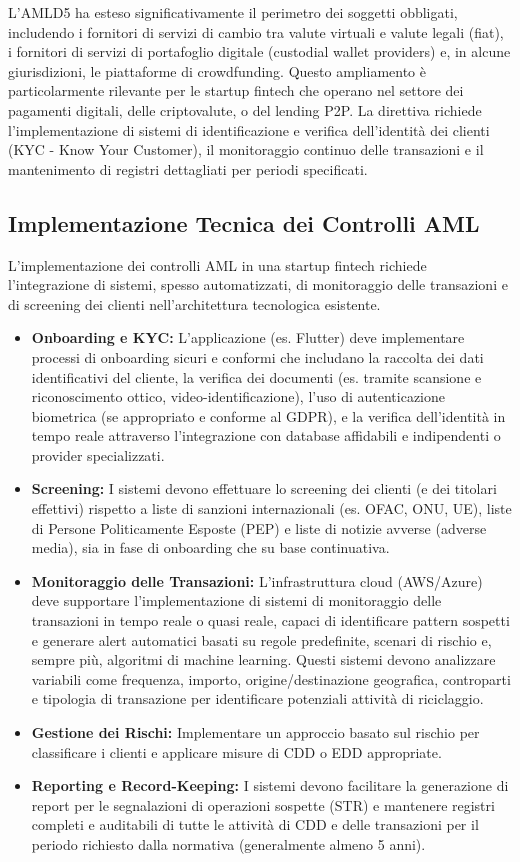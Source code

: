 L'AMLD5 ha esteso significativamente il perimetro dei soggetti obbligati, includendo i fornitori di servizi di cambio tra valute virtuali e valute legali (fiat), i fornitori di servizi di portafoglio digitale (custodial wallet providers) e, in alcune giurisdizioni, le piattaforme di crowdfunding. Questo ampliamento è particolarmente rilevante per le startup fintech che operano nel settore dei pagamenti digitali, delle criptovalute, o del lending P2P. La direttiva richiede l'implementazione di sistemi di identificazione e verifica dell'identità dei clienti (KYC - Know Your Customer), il monitoraggio continuo delle transazioni e il mantenimento di registri dettagliati per periodi specificati.

\subsection{Implementazione Tecnica dei Controlli AML}
L'implementazione dei controlli AML in una startup fintech richiede l'integrazione di sistemi, spesso automatizzati, di monitoraggio delle transazioni e di screening dei clienti nell'architettura tecnologica esistente.
\begin{itemize}
    \item \textbf{Onboarding e KYC:} L'applicazione (es. Flutter) deve implementare processi di onboarding sicuri e conformi che includano la raccolta dei dati identificativi del cliente, la verifica dei documenti (es. tramite scansione e riconoscimento ottico, video-identificazione), l'uso di autenticazione biometrica (se appropriato e conforme al GDPR), e la verifica dell'identità in tempo reale attraverso l'integrazione con database affidabili e indipendenti o provider specializzati.
    \item \textbf{Screening:} I sistemi devono effettuare lo screening dei clienti (e dei titolari effettivi) rispetto a liste di sanzioni internazionali (es. OFAC, ONU, UE), liste di Persone Politicamente Esposte (PEP) e liste di notizie avverse (adverse media), sia in fase di onboarding che su base continuativa.
    \item \textbf{Monitoraggio delle Transazioni:} L'infrastruttura cloud (AWS/Azure) deve supportare l'implementazione di sistemi di monitoraggio delle transazioni in tempo reale o quasi reale, capaci di identificare pattern sospetti e generare alert automatici basati su regole predefinite, scenari di rischio e, sempre più, algoritmi di machine learning. Questi sistemi devono analizzare variabili come frequenza, importo, origine/destinazione geografica, controparti e tipologia di transazione per identificare potenziali attività di riciclaggio.
    \item \textbf{Gestione dei Rischi:} Implementare un approccio basato sul rischio per classificare i clienti e applicare misure di CDD o EDD appropriate.
    \item \textbf{Reporting e Record-Keeping:} I sistemi devono facilitare la generazione di report per le segnalazioni di operazioni sospette (STR) e mantenere registri completi e auditabili di tutte le attività di CDD e delle transazioni per il periodo richiesto dalla normativa (generalmente almeno 5 anni).
\end{itemize}
